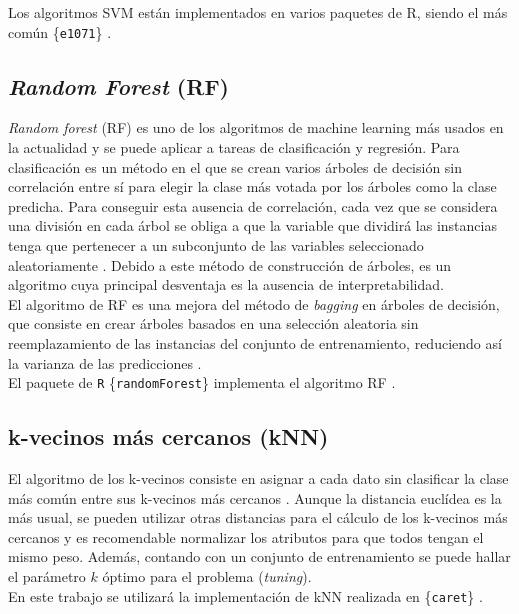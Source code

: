 Los algoritmos SVM están implementados en varios paquetes de R, siendo el más común \{\texttt{e1071}\} \cite{Meyer2019}.

\subsection{\textit{Random Forest} (RF)}

\textit{Random forest} (RF) es uno de los algoritmos de machine learning más usados en la actualidad y se puede aplicar a tareas de clasificación y regresión. Para clasificación es un método en el que se crean varios árboles de decisión sin correlación entre sí para elegir la clase más votada por los árboles como la clase predicha. Para conseguir esta ausencia de correlación, cada vez que se considera una división en cada árbol se obliga a que la variable que dividirá las instancias tenga que pertenecer a un subconjunto de las variables seleccionado aleatoriamente \cite{Breiman2001, Breiman2002}. Debido a este método de construcción de árboles, es un algoritmo cuya principal desventaja es la ausencia de interpretabilidad.\\

El algoritmo de RF es una mejora del método de \textit{bagging} en árboles de decisión, que consiste en crear árboles basados en una selección aleatoria sin reemplazamiento de las instancias del conjunto de entrenamiento, reduciendo así la varianza de las predicciones \cite{Breiman1996}.\\

El paquete de \texttt{R} \{\texttt{randomForest}\} implementa el algoritmo RF \cite{Liaw2002}.

\subsection{k-vecinos más cercanos (kNN)}

El algoritmo de los k-vecinos consiste en asignar a cada dato sin clasificar la clase más común entre sus k-vecinos más cercanos \cite{Altman1992}. Aunque la distancia euclídea es la más usual, se pueden utilizar otras distancias para el cálculo de los k-vecinos más cercanos \cite{Hu2016} y es recomendable normalizar los atributos para que todos tengan el mismo peso. Además, contando con un conjunto de entrenamiento se puede hallar el parámetro $k$ óptimo para el problema (\textit{tuning}).\\

En este trabajo se utilizará la implementación de kNN realizada en \{\texttt{caret}\} \cite{Kuhn2020}.

